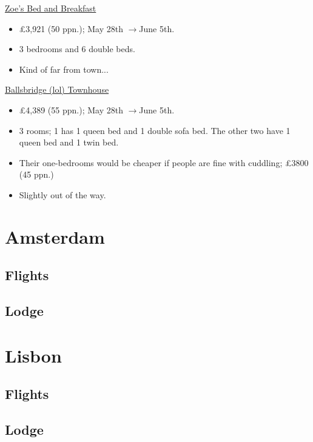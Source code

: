 \documentclass[12pt]{article}
\renewcommand{\to}{$\rightarrow$}
\newcommand{\cost}[2]{\pounds#1 (#2 ppn.)}
\begin{document}
	\href{https://www.airbnb.co.uk/rooms/7305892?adults=10&children=0&infants=0&check_in=2022-05-28&check_out=2022-06-05&federated_search_id=7416d1fc-62a0-4764-a1fa-8f70ded658be&source_impression_id=p3_1648312760_KodxjaW24K6A1UKj}{Zoe's Bed and Breakfast}
	\begin{itemize}
		\item \cost{3,921}{50}; May 28th \to June 5th.
		\item 3 bedrooms and 6 double beds.
		\item Kind of far from town...
	\end{itemize}
	\href{https://www.booking.com/hotel/ie/merrion-road-ballsbridge.html?aid=355028;sid=3f62ec944d118827daff72c411262409;all_sr_blocks=188261006_92403605_0_0_0%2C188261002_348859887_0_0_0%2C188261002_348859887_0_0_0;checkin=2022-05-28;checkout=2022-06-05;dest_id=-1502554;dest_type=city;dist=0;group_adults=10;group_children=0;hapos=4;highlighted_blocks=188261006_92403605_0_0_0%2C188261002_348859887_0_0_0%2C188261002_348859887_0_0_0;hpos=4;matching_block_id=188261006_92403605_0_0_0;no_rooms=1;req_adults=10;req_children=0;room1=A%2CA%2CA%2CA%2CA%2CA%2CA%2CA%2CA%2CA;sb_price_type=total;sr_order=popularity;sr_pri_blocks=188261006_92403605_0_0_0__204900%2C188261002_348859887_0_0_0__161117%2C188261002_348859887_0_0_0__161117;srepoch=1648312598;srpvid=4f9e74ca2749018e;type=total;ucfs=1&#hotelTmpl}{Ballsbridge (lol) Townhouse}
	\begin{itemize}
		\item \cost{4,389}{55}; May 28th \to June 5th.
		\item 3 rooms; 1 has 1 queen bed and 1 double sofa bed. The other two have 1 queen bed and 1 twin bed.
		\item Their one-bedrooms would be cheaper if people are fine with cuddling; \cost{3800}{45}
		\item Slightly out of the way.
	\end{itemize}
	\section{Amsterdam}
	
	\subsection{Flights}
	
	\subsection{Lodge}
	
	\section{Lisbon}
	
	\subsection{Flights}
	
	\subsection{Lodge}
\end{document}
